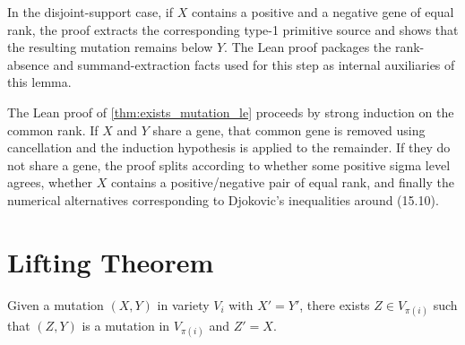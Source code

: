 \begin{lemma}
  \label{lem:Theorem6.disjoint_pair}
  \leanok
  In the disjoint-support case, if $X$ contains a positive and a negative
  gene of equal rank, the proof extracts the corresponding type-1 primitive
  source and shows that the resulting mutation remains below $Y$.  The Lean
  proof packages the rank-absence and summand-extraction facts used for this
  step as internal auxiliaries of this lemma.
\end{lemma}

\begin{remark}
  The Lean proof of \ref{thm:exists_mutation_le} proceeds by strong induction
  on the common rank.  If $X$ and $Y$ share a gene, that common gene is removed
  using cancellation and the induction hypothesis is applied to the remainder.
  If they do not share a gene, the proof splits according to whether some
  positive sigma level agrees, whether $X$ contains a positive/negative pair
  of equal rank, and finally the numerical alternatives corresponding to
  Djokovic's inequalities around (15.10).
\end{remark}


\chapter{Lifting Theorem}

\begin{lemma}
  \label{lem:mutation_lifting}
  Given a mutation $(X, Y)$ in variety $V_i$ with $X' = Y'$,
  there exists $Z \in V_{\pi(i)}$ such that $(Z, Y)$ is a mutation in $V_{\pi(i)}$
  and $Z' = X$.
\end{lemma}




